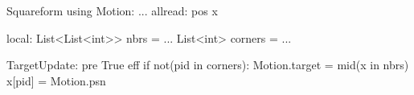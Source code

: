 Squareform
  using Motion:
   ...
  allread:
    pos x$\label{shapeformp}$

  local:
    List<List<int>> nbrs = ...
    List<int> corners = ...
  
  TargetUpdate:
    pre True
    eff if not(pid in corners):
      Motion.target = mid(x in nbrs)
      x[pid] = Motion.psn

    
